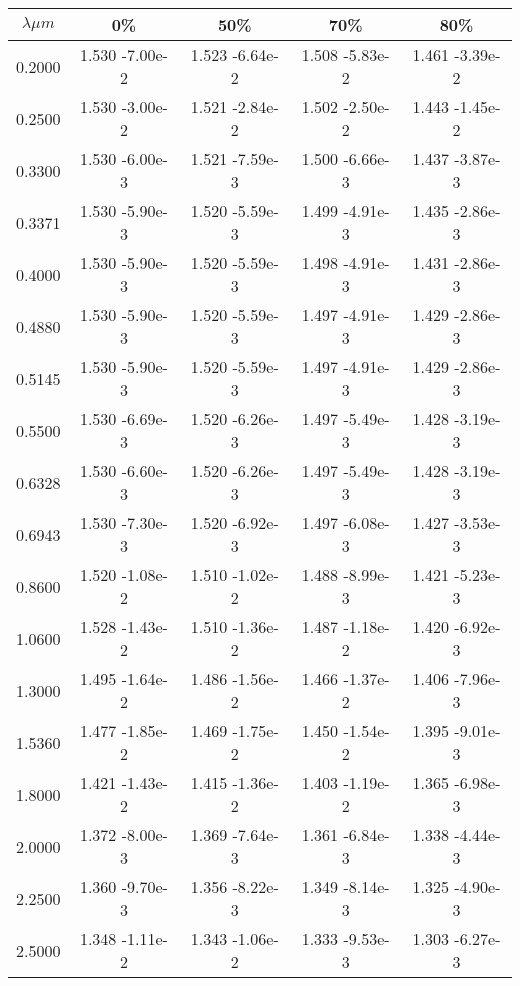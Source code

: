 \documentclass[12pt]{article}
\begin{document}
\begin{center}
\begin{table}
\begin{tabular}{| c | c | c | c | c |  }
\hline
 $\lambda \mu m$   & 0\%  & 50\%  & 70\%  & 80\% \\
\hline
0.2000 & 1.530 -7.00e-2  &  1.523   -6.64e-2  &  1.508   -5.83e-2  &   1.461   -3.39e-2    \\  
0.2500 &  1.530 -3.00e-2 &  1.521   -2.84e-2 &   1.502   -2.50e-2  &   1.443   -1.45e-2   \\  
0.3300 &  1.530 -6.00e-3 &  1.521   -7.59e-3  &  1.500   -6.66e-3  &   1.437   -3.87e-3     \\ 
0.3371 &  1.530 -5.90e-3 &  1.520   -5.59e-3  &  1.499   -4.91e-3  &   1.435   -2.86e-3    \\
0.4000 &  1.530 -5.90e-3 &  1.520   -5.59e-3 &   1.498   -4.91e-3  &   1.431   -2.86e-3    \\
0.4880 &  1.530 -5.90e-3 &  1.520   -5.59e-3 &   1.497   -4.91e-3  &   1.429   -2.86e-3    \\
0.5145 &  1.530 -5.90e-3 &  1.520   -5.59e-3 &   1.497   -4.91e-3  &   1.429   -2.86e-3  \\
0.5500 &  1.530 -6.69e-3 &  1.520   -6.26e-3 &   1.497   -5.49e-3  &   1.428   -3.19e-3   \\
0.6328 &  1.530 -6.60e-3 &  1.520   -6.26e-3 &   1.497   -5.49e-3  &   1.428   -3.19e-3    \\
0.6943 &  1.530 -7.30e-3 &  1.520   -6.92e-3 &   1.497   -6.08e-3 &    1.427   -3.53e-3   \\
0.8600 &  1.520 -1.08e-2 &  1.510   -1.02e-2 &   1.488   -8.99e-3 &    1.421   -5.23e-3   \\
1.0600 &  1.528 -1.43e-2 &  1.510   -1.36e-2 &   1.487   -1.18e-2 &    1.420   -6.92e-3    \\
1.3000 &  1.495 -1.64e-2 &  1.486   -1.56e-2 &   1.466   -1.37e-2  &   1.406   -7.96e-3     \\
1.5360 &  1.477 -1.85e-2 &  1.469   -1.75e-2 &   1.450   -1.54e-2 &    1.395   -9.01e-3    \\
1.8000 &  1.421 -1.43e-2 &  1.415   -1.36e-2 &   1.403   -1.19e-2  &   1.365   -6.98e-3    \\
2.0000 &  1.372 -8.00e-3 &  1.369   -7.64e-3 &   1.361   -6.84e-3  &   1.338   -4.44e-3     \\
2.2500 &  1.360 -9.70e-3 &  1.356   -8.22e-3 &   1.349   -8.14e-3  &   1.325   -4.90e-3    \\
2.5000 &  1.348 -1.11e-2 &  1.343   -1.06e-2 &   1.333   -9.53e-3 &    1.303   -6.27e-3   \\

\end{tabular}
\end{table}
\end{center}
\end{document}
